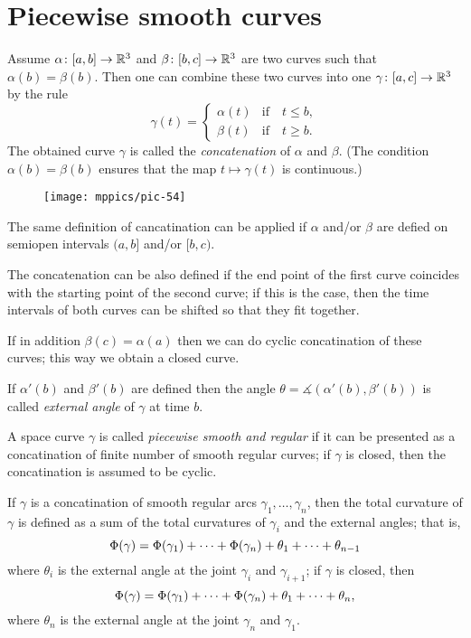 \section*{Piecewise smooth curves}

{\sloppy

Assume $\alpha\colon[a,b]\to \mathbb{R}^3$ and $\beta\:[b,c]\z\to \RR^3$ are two curves such that $\alpha(b)=\beta(b)$.
Then one can combine these two curves into one $\gamma\:[a,c]\z\to \RR^3$ by the rule 
\[\gamma(t)=
\begin{cases}
\alpha(t)&\text{if}\quad t\le b,
\\
\beta(t)&\text{if}\quad t\ge b.
\end{cases}
\]
The obtained curve $\gamma$ is called the 
\emph{concatenation} of $\alpha$ and $\beta$. %
(The condition $\alpha(b)=\beta(b)$ ensures that the map $t\mapsto\gamma(t)$ is continuous.)

}

\begin{wrapfigure}{r}{30 mm}
\vskip-0mm
\centering
\texttt{[image: mppics/pic-54]}
\end{wrapfigure}

The same definition of cancatination can be applied if $\alpha$ and/or $\beta$ are defied on semiopen intervals 
$(a,b]$ and/or $[b,c)$.

The concatenation can be also defined if the end point of the first curve coincides with the starting point of the second curve;
if this is the case, then the time intervals of both curves can be shifted so that they fit together. 

If in addition $\beta(c)=\alpha(a)$ then we can do cyclic concatination of these curves;
this way we obtain a closed curve.

If $\alpha'(b)$ and $\beta'(b)$ are defined then the angle $\theta=\measuredangle(\alpha'(b),\beta'(b))$ is called \emph{external angle} of $\gamma$ at time $b$.

A space curve $\gamma$ is called \emph{piecewise smooth and regular} if it can be presented as a concatination of finite number of smooth regular curves; if $\gamma$ is closed, then the  concatination is assumed to be cyclic.

If $\gamma$ is a concatination of smooth regular arcs $\gamma_1,\dots,\gamma_n$, then the total curvature of $\gamma$ is defined as a sum of the total curvatures of $\gamma_i$ and the external angles;
that is, 
\[\Phi({\gamma})=\Phi({\gamma_1})+\dots+\Phi({\gamma_n})+\theta_1+\dots+\theta_{n-1}\]
where $\theta_i$ is the external angle at the joint $\gamma_i$ and $\gamma_{i+1}$;
if $\gamma$ is closed, then 
\[\Phi({\gamma})=\Phi({\gamma_1})+\dots+\Phi({\gamma_n})+\theta_1+\dots+\theta_{n},\]
where $\theta_n$ is the external angle at the joint $\gamma_n$ and $\gamma_1$.

